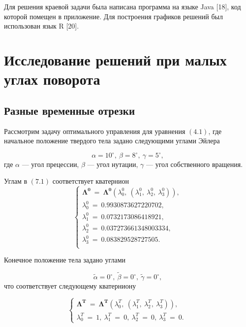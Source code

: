 \documentclass[14pt]{extreport}
\begin{document}
Для решения краевой задачи была написана программа на языке Java [18], код которой помещен в приложение. Для построения графиков решений был использован язык R [20].

\newpage

\chapter{Исследование решений при малых углах поворота}

\section{Разные временные отрезки}
Рассмотрим задачу оптимального управления для уравнения $(4.1)$, где начальное положение твердого тела задано следующими углами Эйлера 

\begin{equation}
 \alpha = 10^{\circ}, \ \beta = 8^{\circ},\ \gamma = 5^{\circ}, 
\end{equation}
где $\alpha$ --- угол прецессии, $\beta$ --- угол нутации, $\gamma$ --- угол собственного вращения.

Углам в $(7.1)$ соответствует кватернион
\begin{equation}
\begin{cases}
 \boldsymbol{\Lambda^{0}}\ =\ \boldsymbol{\Lambda^{0}}(\lambda_0^{0},\ (\lambda_1^{0},\ \lambda_2^{0},\ \lambda_3^{0})), \\
 \lambda_{0}^{0}\ =\ 0.9930873627220702, \\
 \lambda_{1}^{0}\ =\ 0.0732173086418921, \\
 \lambda_{2}^{0}\ =\ 0.037273661348003334, \\
 \lambda_{3}^{0}\ =\ 0.083829528727505. \\
\end{cases}
\end{equation}

Конечное положение тела задано углами

\begin{equation}
 \widetilde{\alpha} = 0^{\circ}, \ \widetilde{\beta} = 0^{\circ},\ \widetilde{\gamma} = 0^{\circ}, 
\end{equation}
что соответствует следующему кватерниону

\begin{equation}
\begin{cases}
 \boldsymbol{\Lambda^{T}}\ =\ \boldsymbol{\Lambda^{T}}(\lambda_0^{T},\ (\lambda_1^{T},\ \lambda_2^{T},\ \lambda_3^{T})), \\
 \lambda_{0}^{T}\ =\ 1, \ 
 \lambda_{1}^{T}\ =\ 0, \ 
 \lambda_{2}^{T}\ =\ 0, \ 
 \lambda_{3}^{T}\ =\ 0. \ 
\end{cases}
\end{equation}
\end{document}
